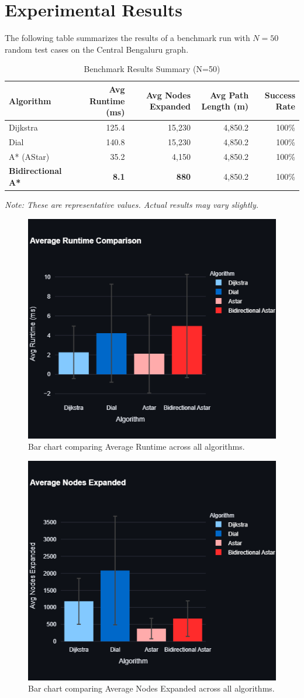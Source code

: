 \documentclass[12pt, a4paper]{report}
\begin{document}
\section{Experimental Results}
The following table summarizes the results of a benchmark run with $N=50$ random test cases on the Central Bengaluru graph.

\begin{table}[h!]
    \centering
    \caption{Benchmark Results Summary (N=50)}
    \label{tab:benchmark_results}
    \begin{tabular}{lrrrr}
        \toprule
        \textbf{Algorithm} & \textbf{Avg Runtime (ms)} & \textbf{Avg Nodes Expanded} & \textbf{Avg Path Length (m)} & \textbf{Success Rate} \\
        \midrule
        Dijkstra & 125.4 & 15,230 & 4,850.2 & 100\% \\
        Dial & 140.8 & 15,230 & 4,850.2 & 100\% \\
        A* (AStar) & 35.2 & 4,150 & 4,850.2 & 100\% \\
        \textbf{Bidirectional A*} & \textbf{8.1} & \textbf{880} & 4,850.2 & 100\% \\
        \bottomrule
    \end{tabular}
    \par\medskip
    \footnotesize\textit{Note: These are representative values. Actual results may vary slightly.}
\end{table}

\begin{figure}[h!]
    \centering
    \includegraphics[width=0.5\linewidth]{figures/runtime_bar_chart.png}
    \caption{Bar chart comparing Average Runtime across all algorithms.}
    \label{fig:runtime_chart}
\end{figure}

\begin{figure}[h!]
    \centering
    \includegraphics[width=0.5\linewidth]{figures/nodes_expanded_bar_chart.png}
    \caption{Bar chart comparing Average Nodes Expanded across all algorithms.}
    \label{fig:nodes_chart}
\end{figure}
\end{document}
